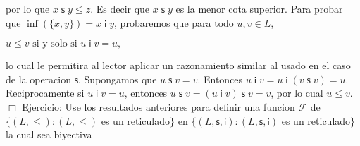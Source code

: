por lo que \(x\;\mathsf{s\;}y\leq z\). Es decir que \(x\;\mathsf{s\;}y\) es la menor cota superior.
Para probar que \(\inf (\{x,y\})=x\mathsf{\;i\;}y\), probaremos que para todo \( u,v\in L\),

\(\displaystyle u\leq v\text{ si y solo si }u\mathsf{\;i\;}v=u, \)

lo cual le permitira al lector aplicar un razonamiento similar al usado en el caso de la operacion \(\mathsf{s}\). Supongamos que \(u\;\mathsf{s}\;v=v\). Entonces \(u\mathsf{\;i\;}v=u\mathsf{\;i\;}(v\;\mathsf{s}\;v)=u\). Reciprocamente si \(u\mathsf{\;i\;}v=u\), entonces \(u\;\mathsf{s}\;v=(u\mathsf{ \;i\;}v)\;\mathsf{s}\;v=v\), por lo cual \(u\leq v\). \(\Box\)
Ejercicio: Use los resultados anteriores para definir una funcion \( \mathcal{F}\) de \(\{(L,\leq ):(L,\leq )\) es un reticulado\(\}\) en \(\{(L, \mathsf{s},\mathsf{i}):(L,\mathsf{s},\mathsf{i})\) es un reticulado\(\}\) la cual sea biyectiva
